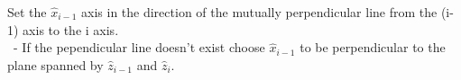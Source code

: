 \documentclass[preview]{standalone}
\begin{document}
\begin{center}
Set the $\hat{x}_{i-1}$ axis in the direction of the mutually perpendicular line from the (i-1) axis to the i axis.\\\
                 - If the pependicular line doesn't exist choose $\hat{x}_{i-1}$ to be perpendicular to the plane spanned by $\hat{z}_{i-1}$ and $\hat{z}_{i}$.
\end{center}
\end{document}
